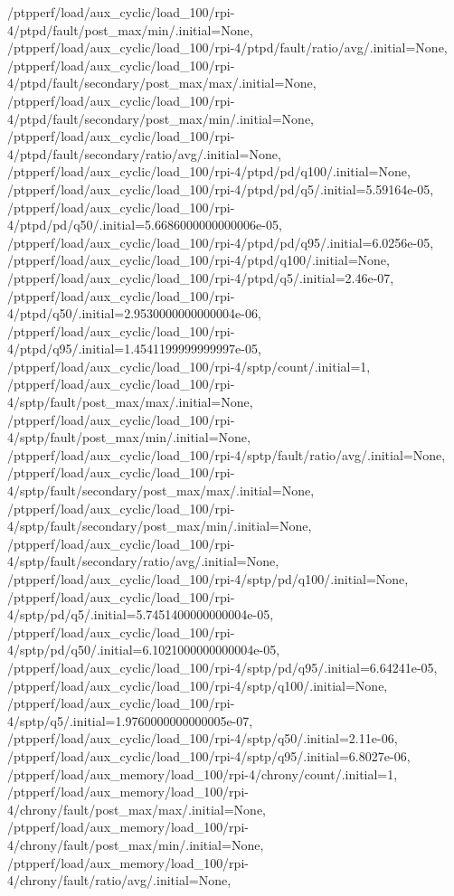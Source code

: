 {    /ptpperf/load/aux_cyclic/load_100/rpi-4/ptpd/fault/post_max/min/.initial=None,
    /ptpperf/load/aux_cyclic/load_100/rpi-4/ptpd/fault/ratio/avg/.initial=None,
    /ptpperf/load/aux_cyclic/load_100/rpi-4/ptpd/fault/secondary/post_max/max/.initial=None,
    /ptpperf/load/aux_cyclic/load_100/rpi-4/ptpd/fault/secondary/post_max/min/.initial=None,
    /ptpperf/load/aux_cyclic/load_100/rpi-4/ptpd/fault/secondary/ratio/avg/.initial=None,
    /ptpperf/load/aux_cyclic/load_100/rpi-4/ptpd/pd/q100/.initial=None,
    /ptpperf/load/aux_cyclic/load_100/rpi-4/ptpd/pd/q5/.initial=5.59164e-05,
    /ptpperf/load/aux_cyclic/load_100/rpi-4/ptpd/pd/q50/.initial=5.6686000000000006e-05,
    /ptpperf/load/aux_cyclic/load_100/rpi-4/ptpd/pd/q95/.initial=6.0256e-05,
    /ptpperf/load/aux_cyclic/load_100/rpi-4/ptpd/q100/.initial=None,
    /ptpperf/load/aux_cyclic/load_100/rpi-4/ptpd/q5/.initial=2.46e-07,
    /ptpperf/load/aux_cyclic/load_100/rpi-4/ptpd/q50/.initial=2.9530000000000004e-06,
    /ptpperf/load/aux_cyclic/load_100/rpi-4/ptpd/q95/.initial=1.4541199999999997e-05,
    /ptpperf/load/aux_cyclic/load_100/rpi-4/sptp/count/.initial=1,
    /ptpperf/load/aux_cyclic/load_100/rpi-4/sptp/fault/post_max/max/.initial=None,
    /ptpperf/load/aux_cyclic/load_100/rpi-4/sptp/fault/post_max/min/.initial=None,
    /ptpperf/load/aux_cyclic/load_100/rpi-4/sptp/fault/ratio/avg/.initial=None,
    /ptpperf/load/aux_cyclic/load_100/rpi-4/sptp/fault/secondary/post_max/max/.initial=None,
    /ptpperf/load/aux_cyclic/load_100/rpi-4/sptp/fault/secondary/post_max/min/.initial=None,
    /ptpperf/load/aux_cyclic/load_100/rpi-4/sptp/fault/secondary/ratio/avg/.initial=None,
    /ptpperf/load/aux_cyclic/load_100/rpi-4/sptp/pd/q100/.initial=None,
    /ptpperf/load/aux_cyclic/load_100/rpi-4/sptp/pd/q5/.initial=5.7451400000000004e-05,
    /ptpperf/load/aux_cyclic/load_100/rpi-4/sptp/pd/q50/.initial=6.1021000000000004e-05,
    /ptpperf/load/aux_cyclic/load_100/rpi-4/sptp/pd/q95/.initial=6.64241e-05,
    /ptpperf/load/aux_cyclic/load_100/rpi-4/sptp/q100/.initial=None,
    /ptpperf/load/aux_cyclic/load_100/rpi-4/sptp/q5/.initial=1.9760000000000005e-07,
    /ptpperf/load/aux_cyclic/load_100/rpi-4/sptp/q50/.initial=2.11e-06,
    /ptpperf/load/aux_cyclic/load_100/rpi-4/sptp/q95/.initial=6.8027e-06,
    /ptpperf/load/aux_memory/load_100/rpi-4/chrony/count/.initial=1,
    /ptpperf/load/aux_memory/load_100/rpi-4/chrony/fault/post_max/max/.initial=None,
    /ptpperf/load/aux_memory/load_100/rpi-4/chrony/fault/post_max/min/.initial=None,
    /ptpperf/load/aux_memory/load_100/rpi-4/chrony/fault/ratio/avg/.initial=None,
}

